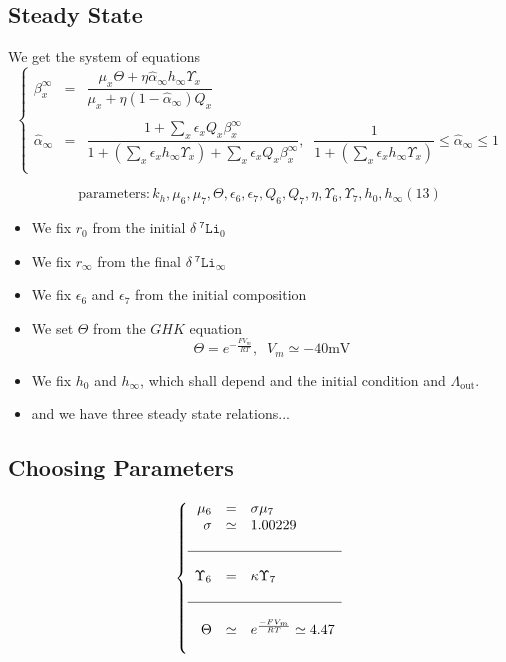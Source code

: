 \documentclass[aps,onecolumn,10pt]{revtex4}
\newcommand{\mychem}[1]{\mathtt{#1}}
\newcommand{\spLi}[1]{{~^{\mychem{#1}}\mychem{Li}}}
\newcommand{\deltaLi}{ {\delta\!\!\!\spLi{7}} }
\newcommand{\LiAll}{\Lambda}
\newcommand{\LiAllOut}{{\LiAll}_{\mathrm{out}}}
\begin{document}
\subsection{Steady State}
We get the system of equations
\begin{equation}
\label{eq:steady}
\left\lbrace
\begin{array}{rcl}
	\beta_x^\infty & = & \dfrac{\mu_x\Theta + \eta \hat\alpha_\infty h_\infty \Upsilon_x}{\mu_x + \eta (1-\hat\alpha_\infty) Q_x}\\\
	\\
	\hat\alpha_\infty & = & \dfrac{1+\sum_x\epsilon_x Q_x\beta_x^\infty
	}{1 + \left(\sum_x \epsilon_x h_\infty \Upsilon_x \right) + \sum_x\epsilon_x Q_x\beta_x^\infty
	}, \;\; \dfrac{1}{1+\left(\sum_x \epsilon_x h_\infty \Upsilon_x \right)}\leq\hat\alpha_\infty \leq 1\\\
\end{array}
\right.
\end{equation}

\begin{equation}
\text{parameters} : k_h, \mu_6, \mu_7, \Theta, \epsilon_6, \epsilon_7, Q_6, Q_7, \eta, \Upsilon_6, \Upsilon_7, h_0, h_\infty (13)
\end{equation}

\begin{itemize}
	\item We fix $r_0$ from the initial $\deltaLi_0$
	\item We fix $r_\infty$ from the final $\deltaLi_\infty$
	\item We fix $\epsilon_6$ and $\epsilon_7$ from the initial composition
	\item We set $\Theta$ from the $GHK$ equation
	$$
		\Theta = e^{ -\frac{FV_m}{RT} },\;\;V_m\simeq -40\text{mV}
	$$
	\item We fix $h_0$ and $h_\infty$, which shall depend and the initial condition and $\LiAllOut$.
	\item and we have three steady state relations...
\end{itemize}

\subsection{Choosing Parameters}

\begin{equation}
\left\lbrace
\begin{array}{rcl}
		\mu_6     & = & \sigma \mu_7\\
		\sigma    & \simeq & 1.00229 \\
		\\
		\hline
		\\
		\Upsilon_6 & = & \kappa \Upsilon_7\\
		\\
		\hline
		\\
		\Theta     & \simeq  & e^{\frac{-F V_m}{RT} } \simeq 4.47\\
		\\
\end{array}
\right.
\end{equation}
\end{document}

